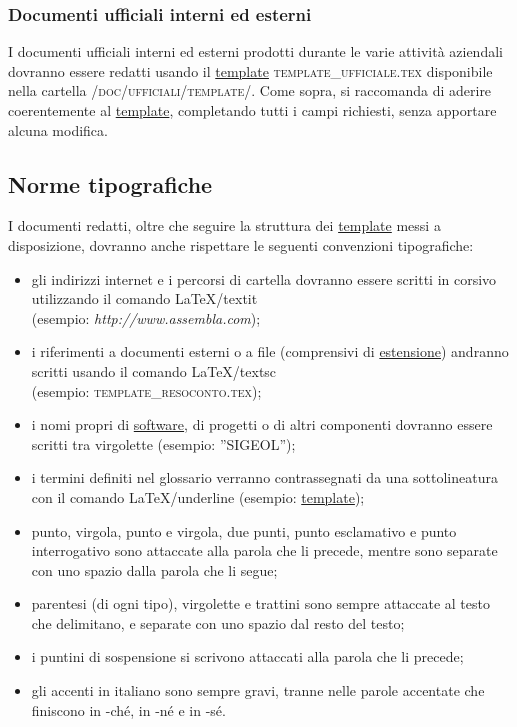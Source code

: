 \documentclass[11pt,a4paper]{article}
\begin{document}
\subsubsection{Documenti ufficiali interni ed esterni}
I documenti ufficiali interni ed esterni prodotti durante le varie attività aziendali dovranno essere redatti usando il \underline{template} \textsc{template\_ufficiale.tex} disponibile nella cartella \textsc{/doc/ufficiali/template/}.
Come sopra, si raccomanda di aderire coerentemente al \underline{template}, completando tutti i campi richiesti, senza apportare alcuna modifica.
\subsection{Norme tipografiche}
I documenti redatti, oltre che seguire la struttura  dei \underline{template} messi a disposizione, dovranno anche rispettare le seguenti convenzioni tipografiche:
\begin{itemize}
	\item gli indirizzi internet e i percorsi di cartella dovranno essere scritti in corsivo utilizzando il comando \LaTeX \space /textit 
\\ (esempio: \textit{http://www.assembla.com});
	\item i riferimenti a documenti esterni o a file (comprensivi di \underline{estensione}) andranno scritti usando il comando \LaTeX \space /textsc 
\\ (esempio: \textsc{template\_resoconto.tex});
	\item i nomi propri di \underline{software}, di progetti o di altri componenti dovranno essere scritti tra virgolette (esempio: ''SIGEOL'');
	\item i termini definiti nel glossario verranno contrassegnati da una sottolineatura con il comando \LaTeX \space /underline (esempio: \underline{template});
	\item punto, virgola, punto e virgola, due punti, punto esclamativo e punto interrogativo sono attaccate alla parola che li precede, mentre sono separate con uno spazio dalla parola che li segue;
	\item parentesi (di ogni tipo), virgolette e trattini sono sempre attaccate al testo che delimitano, e separate con uno spazio dal resto del testo;
	\item i puntini di sospensione si scrivono attaccati alla parola che li precede;
	\item gli accenti in italiano sono sempre gravi, tranne nelle parole accentate che finiscono in -ché, in -né e in -sé.
\end{itemize}
\end{document}
